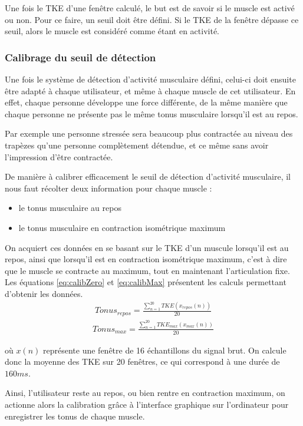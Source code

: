 \documentclass[letterpaper, twoside, 12pt, memoire, creativecommons, hyperref]{thETS}
\begin{document}
Une fois le TKE d'une fenêtre calculé, le but est de savoir si le muscle est activé ou non. Pour ce faire, un seuil doit être défini. Si le TKE de la fenêtre dépasse ce seuil, alors le muscle est considéré comme étant en activité.

\subsubsection{Calibrage du seuil de détection}

Une fois le système de détection d'activité musculaire défini, celui-ci doit ensuite être adapté à chaque utilisateur, et même à chaque muscle de cet utilisateur. En effet, chaque personne développe une force différente, de la même manière que chaque personne ne présente pas le même tonus musculaire lorsqu'il est au repos. 

Par exemple une personne stressée sera beaucoup plus contractée au niveau des trapèzes qu'une personne complètement détendue, et ce même sans avoir l'impression d'être contractée.

De manière à calibrer efficacement le seuil de détection d'activité musculaire, il nous faut récolter deux information pour chaque muscle : 

\begin{itemize}
 \item le tonus musculaire au repos
 \item le tonus musculaire en contraction isométrique maximum
\end{itemize}

On acquiert ces données en se basant sur le TKE d'un muscule lorsqu'il est au repos, ainsi que lorsqu'il est en contraction isométrique maximum, c'est à dire que le muscle se contracte au maximum, tout en maintenant l'articulation fixe. Les équations \ref{eq:calibZero} et \ref{eq:calibMax} présentent les calculs permettant d'obtenir les données.
\begin{align}\label{eq:calibZero}
   Tonus_{repos} = \frac{\sum_{n=1}^{20}TKE(x_{repos}(n))}{20} 
\end{align}
\begin{align}\label{eq:calibMax}
   Tonus_{max} = \frac{\sum_{n=1}^{20}TKE_{max}(x_{max}(n))}{20} 
\end{align}

où $x(n)$ représente une fenêtre de 16 échantillons du signal brut. On calcule donc la moyenne des TKE sur 20 fenêtres, ce qui correspond à une durée de $160ms$. 

Ainsi, l'utilisateur reste au repos, ou bien rentre en contraction maximum, on actionne alors la calibration grâce à l'interface graphique sur l'ordinateur pour enregistrer les tonus de chaque muscle.
\end{document}
